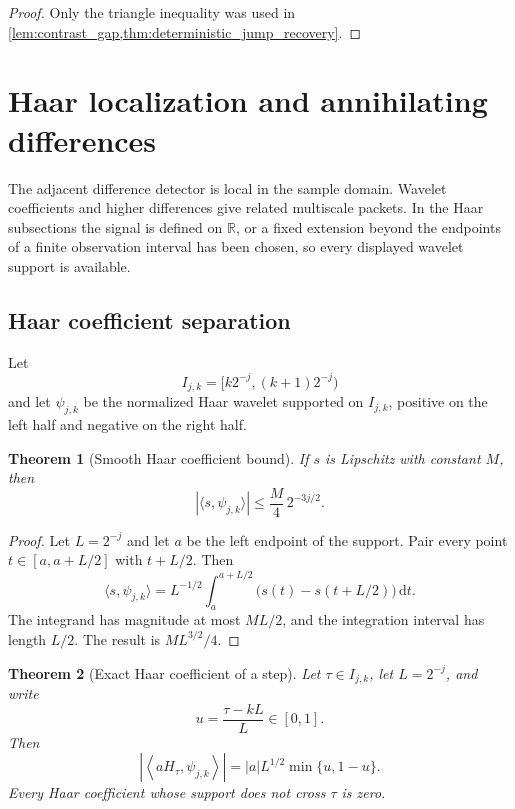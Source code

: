 \documentclass{aomart}
\newtheorem{theorem}{Theorem}[section]
\theoremstyle{definition}
\theoremstyle{remark}
\newcommand{\RR}{\mathbb R}
\newcommand{\dd}{\,\mathrm d}
\begin{document}
\begin{proof}
Only the triangle inequality was used in \cref{lem:contrast_gap,thm:deterministic_jump_recovery}.
\end{proof}

\section{Haar localization and annihilating differences}\label{sec:localization}

The adjacent difference detector is local in the sample domain. Wavelet coefficients and higher differences give related multiscale packets. In the Haar subsections the signal is defined on \(\RR\), or a fixed extension beyond the endpoints of a finite observation interval has been chosen, so every displayed wavelet support is available.

\subsection{Haar coefficient separation}

Let
\[
I_{j,k}
=
[k2^{-j},(k+1)2^{-j})
\]
and let \(\psi_{j,k}\) be the normalized Haar wavelet supported on \(I_{j,k}\), positive on the left half and negative on the right half.

\begin{theorem}[Smooth Haar coefficient bound]\label{thm:smooth_haar_bound}
If \(s\) is Lipschitz with constant \(M\), then
\[
|\langle s,\psi_{j,k}\rangle|
\leq
\frac M4\,2^{-3j/2}.
\]
\end{theorem}

\begin{proof}
Let \(L=2^{-j}\) and let \(a\) be the left endpoint of the support. Pair every point \(t\in[a,a+L/2]\) with \(t+L/2\). Then
\[
\langle s,\psi_{j,k}\rangle
=
L^{-1/2}
\int_a^{a+L/2}
\bigl(s(t)-s(t+L/2)\bigr)\dd t.
\]
The integrand has magnitude at most \(ML/2\), and the integration interval has length \(L/2\). The result is \(ML^{3/2}/4\).
\end{proof}

\begin{theorem}[Exact Haar coefficient of a step]\label{thm:haar_step_coefficient}
Let \(\tau\in I_{j,k}\), let \(L=2^{-j}\), and write
\[
u=\frac{\tau-kL}{L}\in[0,1].
\]
Then
\[
\left|
\left\langle
 aH_\tau,\psi_{j,k}
\right\rangle
\right|
=
|a|L^{1/2}\min\{u,1-u\}.
\]
Every Haar coefficient whose support does not cross \(\tau\) is zero.
\end{theorem}
\end{document}
